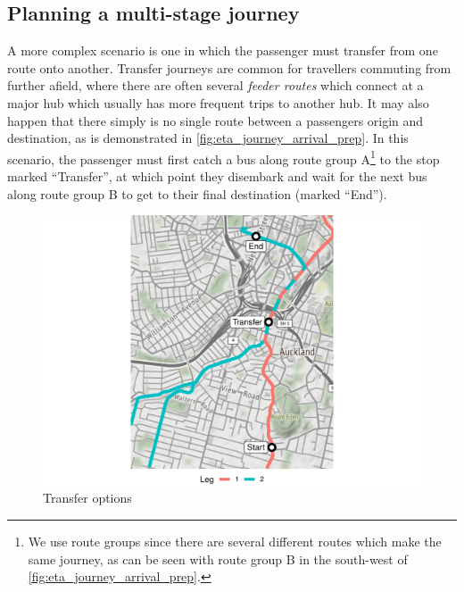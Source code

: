 \subsection{Planning a multi-stage journey}
\label{sec:journey_transfer}

A more complex scenario is one in which the passenger must transfer from one route onto another. Transfer journeys are common for travellers commuting from further afield, where there are often several \emph{feeder routes} which connect at a major hub which usually has more frequent trips to another hub. It may also happen that there simply is no single route between a passengers origin and destination, as is demonstrated in \cref{fig:eta_journey_arrival_prep}. In this scenario, the passenger must first catch a bus along route group A\footnote{We use route groups since there are several different routes which make the same journey, as can be seen with route group B in the south-west of \cref{fig:eta_journey_arrival_prep}.} to the stop marked ``Transfer'', at which point they disembark and wait for the next bus along route group B to get to their final destination (marked ``End'').



\begin{knitrout}\small
{}\color{fgcolor}\begin{figure}

{\centering \includegraphics[width=\textwidth]{figure/eta_journey_transfer_prep-1} 

}

\caption[Transfer options]{Transfer options}\label{fig:eta_journey_transfer_prep}
\end{figure}


\end{knitrout}



